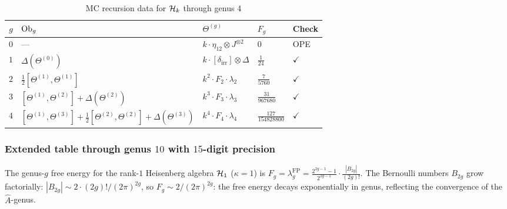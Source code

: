 \begin{table}[ht]
\centering
\caption{MC recursion data for $\mathcal{H}_k$ through genus $4$}
\label{tab:thqg-VII-heis-table}
\begin{tabular}{cllll}
\hline
$g$ & $\mathrm{Ob}_g$ & $\Theta^{(g)}$ & $F_g$ & Check \\
\hline
$0$ & --- & $k \cdot \eta_{12} \otimes J^{\otimes 2}$ &
 $0$ & OPE \\
$1$ & $\Delta(\Theta^{(0)})$ &
 $k \cdot [\delta_{\mathrm{irr}}] \otimes \Delta$ &
 $\frac{1}{24}$ & $\checkmark$ \\
$2$ & $\frac{1}{2}[\Theta^{(1)},\Theta^{(1)}]$ &
 $k^2 \cdot F_2 \cdot \lambda_2$ &
 $\frac{7}{5760}$ & $\checkmark$ \\
$3$ & $[\Theta^{(1)},\Theta^{(2)}] + \Delta(\Theta^{(2)})$ &
 $k^3 \cdot F_3 \cdot \lambda_3$ &
 $\frac{31}{967680}$ & $\checkmark$ \\
$4$ & $[\Theta^{(1)},\Theta^{(3)}]
 + \frac{1}{2}[\Theta^{(2)},\Theta^{(2)}]
 + \Delta(\Theta^{(3)})$ &
 $k^4 \cdot F_4 \cdot \lambda_4$ &
 $\frac{127}{154828800}$ & $\checkmark$ \\
\hline
\end{tabular}
\end{table}

\subsubsection{Extended table through genus $10$ with $15$-digit precision}
\label{subsubsec:thqg-VII-extended-table}

The genus-$g$ free energy for the rank-$1$ Heisenberg algebra
$\mathcal{H}_1$ ($\kappa = 1$) is
$F_g = \lambda_g^{\mathrm{FP}}
= \frac{2^{2g-1}-1}{2^{2g-1}} \cdot \frac{|B_{2g}|}{(2g)!}$.
The Bernoulli numbers $B_{2g}$ grow factorially:
$|B_{2g}| \sim 2 \cdot (2g)! / (2\pi)^{2g}$, so
$F_g \sim 2/(2\pi)^{2g}$: the free energy decays
exponentially in genus, reflecting the convergence of
the $\hat{A}$-genus.

